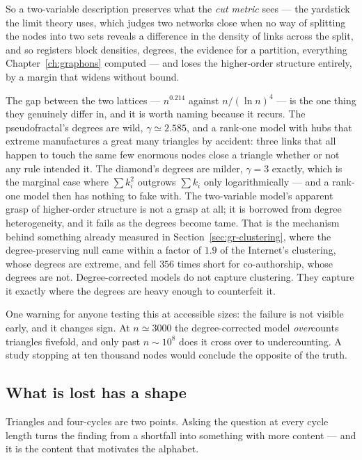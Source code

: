 So a two-variable description preserves what the \emph{cut metric} sees --- the
yardstick the limit theory uses, which judges two networks close when no way of
splitting the nodes into two sets reveals a difference in the density of links
across the split, and so registers block densities, degrees, the evidence for a
partition, everything Chapter~\ref{ch:graphons} computed --- and loses the
higher-order structure entirely, by a margin that widens without bound.

The gap between the two lattices --- $n^{0.214}$ against $n/(\ln n)^4$ --- is the
one thing they genuinely differ in, and it is worth naming because it recurs. The
pseudofractal's degrees are wild, $\gamma\simeq2.585$, and a rank-one model with
hubs that extreme manufactures a great many triangles by accident: three links
that all happen to touch the same few enormous nodes close a triangle whether or
not any rule intended it. The diamond's degrees are milder, $\gamma=3$ exactly,
which is the marginal case where $\sum k_i^2$ outgrows $\sum k_i$ only
logarithmically --- and a rank-one model then has nothing to fake with. The
two-variable model's apparent grasp of higher-order structure is not a grasp at
all; it is borrowed from degree heterogeneity, and it fails as the degrees become
tame. That is the mechanism behind something already measured in
Section~\ref{sec:gr-clustering}, where the degree-preserving null came within a
factor of $1.9$ of the Internet's clustering, whose degrees are extreme, and fell
$356$ times short for co-authorship, whose degrees are not. Degree-corrected
models do not capture clustering. They capture it exactly where the degrees are
heavy enough to counterfeit it.

One warning for anyone testing this at accessible sizes: the failure is not
visible early, and it changes sign. At $n\simeq3000$ the degree-corrected model
\emph{over}counts triangles fivefold, and only past $n\sim10^8$ does it cross
over to undercounting. A study stopping at ten thousand nodes would conclude the
opposite of the truth.

\subsection*{What is lost has a shape}

Triangles and four-cycles are two points. Asking the question at every cycle
length turns the finding from a shortfall into something with more content ---
and it is the content that motivates the alphabet.

